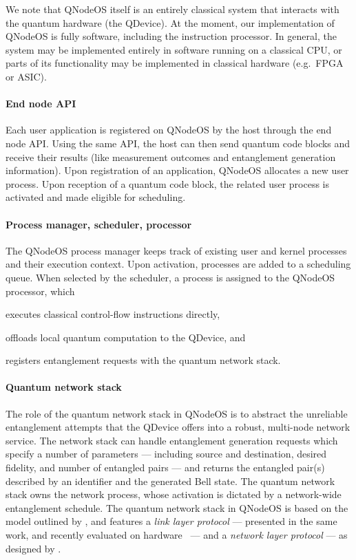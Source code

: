 We note that QNodeOS itself is an entirely classical system that interacts with the quantum hardware
(the QDevice). At the moment, our implementation of QNodeOS is fully software, including the
instruction processor. In general, the system may be implemented entirely in software running on a
classical CPU, or parts of its functionality may be implemented in classical hardware (e.g.~FPGA or
ASIC).

\paragraph{End node API}

Each user application is registered on QNodeOS by the host through the end node API. Using the same
API, the host can then send quantum code blocks and receive their results (like measurement outcomes
and entanglement generation information). Upon registration of an application, QNodeOS allocates a
new user process. Upon reception of a quantum code block, the related user process is activated and
made eligible for scheduling.

\paragraph{Process manager, scheduler, processor}

The QNodeOS process manager keeps track of existing user and kernel processes and their execution
context. Upon activation, processes are added to a scheduling queue. When selected by the scheduler,
a process is assigned to the QNodeOS processor, which
%
\begin{enumerate*}[label=(\arabic*)]
    \item executes classical control-flow instructions directly,
    \item offloads local quantum computation to the QDevice, and
    \item registers entanglement requests with the quantum network stack.
\end{enumerate*}

\paragraph{Quantum network stack}

The role of the quantum network stack in QNodeOS is to abstract the unreliable entanglement attempts
that the QDevice offers into a robust, multi-node network service. The network stack can handle
entanglement generation requests which specify a number of parameters --- including source and
destination, desired fidelity, and number of entangled pairs --- and returns the entangled pair(s)
described by an identifier and the generated Bell state. The quantum network stack owns the network
process, whose activation is dictated by a network-wide entanglement schedule. The quantum network
stack in QNodeOS is based on the model outlined by \textcite{dahlberg_2019_egp}, and features a
\emph{link layer protocol} --- presented in the same work, and recently evaluated on
hardware~\cite{pompili_2022_experimental} --- and a \emph{network layer protocol} --- as designed by
\textcite{kozlowski_2020_qnp}.

